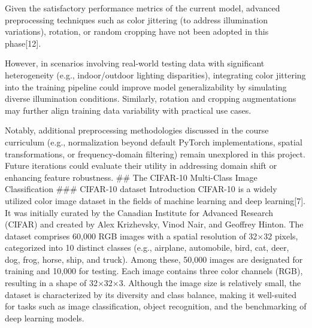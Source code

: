 Given the satisfactory performance metrics of the current model,
advanced preprocessing techniques such as \hspace{0pt}\hspace{0pt}color
jittering\hspace{0pt}\hspace{0pt} (to address illumination variations),
\hspace{0pt}\hspace{0pt}rotation\hspace{0pt}\hspace{0pt}, or
\hspace{0pt}\hspace{0pt}random cropping\hspace{0pt}\hspace{0pt} have not
been adopted in this phase{[}12{]}.

However, in scenarios involving real-world testing data with significant
heterogeneity (e.g., indoor/outdoor lighting disparities), integrating
\hspace{0pt}\hspace{0pt}color jittering\hspace{0pt}\hspace{0pt} into the
training pipeline could improve model generalizability by simulating
diverse illumination conditions. Similarly,
\hspace{0pt}\hspace{0pt}rotation\hspace{0pt}\hspace{0pt} and
\hspace{0pt}\hspace{0pt}cropping\hspace{0pt}\hspace{0pt} augmentations
may further align training data variability with practical use cases.

Notably, additional preprocessing methodologies discussed in the course
curriculum (e.g., normalization beyond default PyTorch implementations,
spatial transformations, or frequency-domain filtering) remain
unexplored in this project. Future iterations could evaluate their
utility in addressing domain shift or enhancing feature robustness. \#\#
The CIFAR-10 Multi-Class Image Classification \#\#\# CIFAR-10 dataset
Introduction CIFAR-10 is a widely utilized color image dataset in the
fields of machine learning and deep learning{[}7{]}. It was initially
curated by the Canadian Institute for Advanced Research (CIFAR) and
created by Alex Krizhevsky, Vinod Nair, and Geoffrey Hinton. The dataset
comprises 60,000 RGB images with a spatial resolution of 32×32 pixels,
categorized into 10 distinct classes (e.g., airplane, automobile, bird,
cat, deer, dog, frog, horse, ship, and truck). Among these, 50,000
images are designated for training and 10,000 for testing. Each image
contains three color channels (RGB), resulting in a shape of 32×32×3.
Although the image size is relatively small, the dataset is
characterized by its diversity and class balance, making it well-suited
for tasks such as image classification, object recognition, and the
benchmarking of deep learning models.

